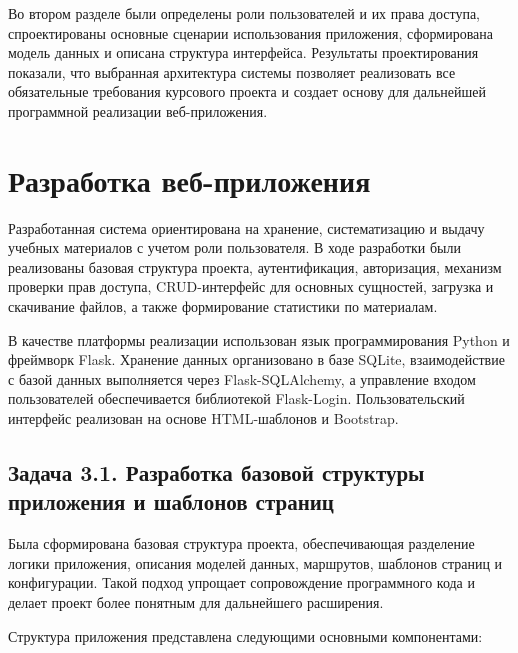 \documentclass[14pt,a4paper]{extarticle}
\begin{document}
Во втором разделе были определены роли пользователей и их права доступа, спроектированы основные сценарии использования приложения, сформирована модель данных и описана структура интерфейса. Результаты проектирования показали, что выбранная архитектура системы позволяет реализовать все обязательные требования курсового проекта и создает основу для дальнейшей программной реализации веб-приложения.

\section{Разработка веб-приложения}

Разработанная система ориентирована на хранение, систематизацию и выдачу учебных материалов с учетом роли пользователя. В ходе разработки были реализованы базовая структура проекта, аутентификация, авторизация, механизм проверки прав доступа, CRUD-интерфейс для основных сущностей, загрузка и скачивание файлов, а также формирование статистики по материалам.

В качестве платформы реализации использован язык программирования Python и фреймворк Flask. Хранение данных организовано в базе SQLite, взаимодействие с базой данных выполняется через Flask-SQLAlchemy, а управление входом пользователей обеспечивается библиотекой Flask-Login. Пользовательский интерфейс реализован на основе HTML-шаблонов и Bootstrap.

\subsection{Задача 3.1. Разработка базовой структуры приложения и шаблонов страниц}

Была сформирована базовая структура проекта, обеспечивающая разделение логики приложения, описания моделей данных, маршрутов, шаблонов страниц и конфигурации. Такой подход упрощает сопровождение программного кода и делает проект более понятным для дальнейшего расширения.

Структура приложения представлена следующими основными компонентами:
\end{document}
